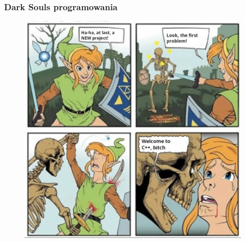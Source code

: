 \documentclass[10pt,t]{beamer}
\begin{document}
\begin{frame}
  \frametitle{Dark Souls programowania}


  \begin{figure}

    \centering


    \includegraphics[scale=0.22]
    {./PresentationsPictures/Dark-Cpp.jpg}

  \end{figure}

\end{frame}
\end{document}
